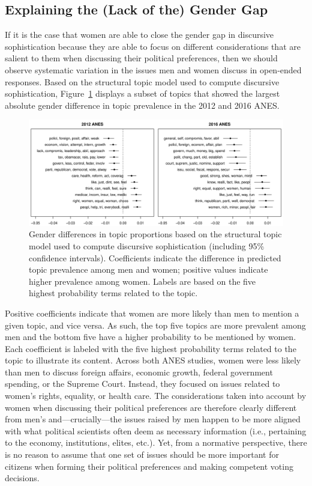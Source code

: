 \documentclass[12pt]{article}
\begin{document}
\subsection*{Explaining the (Lack of the) Gender Gap}

If it is the case that women are able to close the gender gap in discursive sophistication because they are able to focus on different considerations that are salient to them when discussing their political preferences, then we should observe systematic variation in the issues men and women discuss in open-ended responses. Based on the structural topic model used to compute discursive sophistication, Figure~\ref{fig:stm_gender} displays a subset of topics that showed the largest absolute gender difference in topic prevalence in the 2012 and 2016 ANES.

\begin{figure}[h]\centering
\includegraphics[width=\textwidth]{../fig/stm_gender.pdf}
\caption{Gender differences in topic proportions based on the structural topic model used to compute discursive sophistication (including 95\% confidence intervals). Coefficients indicate the difference in predicted topic prevalence among men and women; positive values indicate higher prevalence among women. Labels are based on the five highest probability terms related to the topic.
}\label{fig:stm_gender}
\end{figure}

Positive coefficients indicate that women are more likely than men to mention a given topic, and vice versa. As such, the top five topics are more prevalent among men and the bottom five have a higher probability to be mentioned by women. Each coefficient is labeled with the five highest probability terms related to the topic to illustrate its content. Across both ANES studies, women were less likely than men to discuss foreign affairs, economic growth, federal government spending, or the Supreme Court. Instead, they focused on issues related to women's rights, equality, or health care. The considerations taken into account by women when discussing their political preferences are therefore clearly different from men's and---crucially---the issues raised by men happen to be more aligned with what political scientists often deem as necessary information (i.e., pertaining to the economy, institutions, elites, etc.). Yet, from a normative perspective, there is no reason to assume that one set of issues should be more important for citizens when forming their political preferences and making competent voting decisions.
\end{document}

